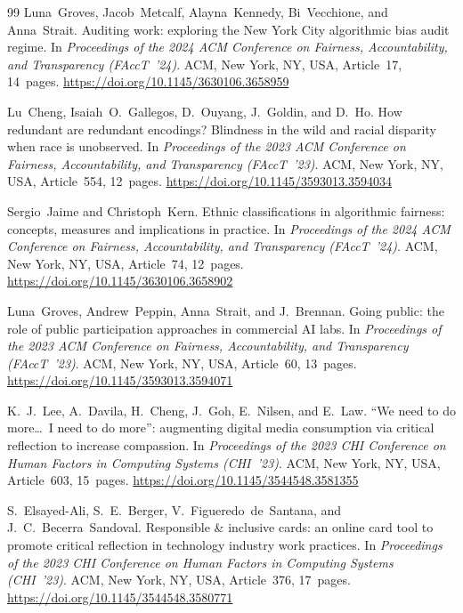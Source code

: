 \documentclass[sigconf,screen]{acmart}
\begin{document}
\begin{thebibliography}{99}
Luna~Groves, Jacob~Metcalf, Alayna~Kennedy, Bi~Vecchione, and Anna~Strait.
\newblock Auditing work: exploring the New York City algorithmic bias audit regime.
\newblock In \emph{Proceedings of the 2024 ACM Conference on Fairness,
Accountability, and Transparency (FAccT~'24)}. ACM, New York, NY, USA,
Article~17, 14~pages.
\newblock \url{https://doi.org/10.1145/3630106.3658959}

Lu~Cheng, Isaiah~O.~Gallegos, D.~Ouyang, J.~Goldin, and D.~Ho.
\newblock How redundant are redundant encodings? Blindness in the wild and racial
disparity when race is unobserved.
\newblock In \emph{Proceedings of the 2023 ACM Conference on Fairness,
Accountability, and Transparency (FAccT~'23)}. ACM, New York, NY, USA,
Article~554, 12~pages.
\newblock \url{https://doi.org/10.1145/3593013.3594034}

Sergio~Jaime and Christoph~Kern.
\newblock Ethnic classifications in algorithmic fairness: concepts, measures and
implications in practice.
\newblock In \emph{Proceedings of the 2024 ACM Conference on Fairness,
Accountability, and Transparency (FAccT~'24)}. ACM, New York, NY, USA,
Article~74, 12~pages.
\newblock \url{https://doi.org/10.1145/3630106.3658902}

Luna~Groves, Andrew~Peppin, Anna~Strait, and J.~Brennan.
\newblock Going public: the role of public participation approaches in commercial
AI labs.
\newblock In \emph{Proceedings of the 2023 ACM Conference on Fairness,
Accountability, and Transparency (FAccT~'23)}. ACM, New York, NY, USA,
Article~60, 13~pages.
\newblock \url{https://doi.org/10.1145/3593013.3594071}

K.~J.~Lee, A.~Davila, H.~Cheng, J.~Goh, E.~Nilsen, and E.~Law.
\newblock ``We need to do more\ldots\ I need to do more'': augmenting digital media
consumption via critical reflection to increase compassion.
\newblock In \emph{Proceedings of the 2023 CHI Conference on Human Factors in
Computing Systems (CHI~'23)}. ACM, New York, NY, USA, Article~603, 15~pages.
\newblock \url{https://doi.org/10.1145/3544548.3581355}

S.~Elsayed-Ali, S.~E.~Berger, V.~Figueredo~de~Santana, and J.~C.~Becerra~Sandoval.
\newblock Responsible \& inclusive cards: an online card tool to promote critical
reflection in technology industry work practices.
\newblock In \emph{Proceedings of the 2023 CHI Conference on Human Factors in
Computing Systems (CHI~'23)}. ACM, New York, NY, USA, Article~376, 17~pages.
\newblock \url{https://doi.org/10.1145/3544548.3580771}


\end{thebibliography}
\end{document}
